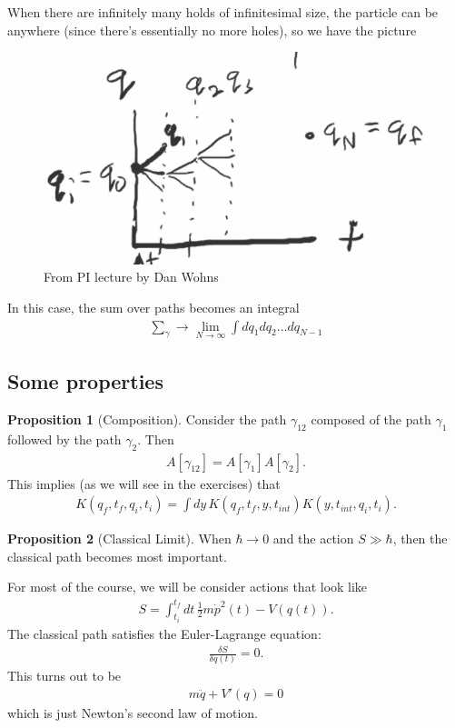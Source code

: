 \documentclass{book}
\theoremstyle{definition}
\newtheorem{prop}{Proposition}[section]
\newcommand{\f}[2]{\frac{#1}{#2}}
\begin{document}
When there are infinitely many holds of infinitesimal size, the particle can be anywhere (since there's essentially no more holes), so we have the picture
\begin{figure}[!htb]
	\centering
	\includegraphics[scale=0.5]{time}
	\caption{From PI lecture by Dan Wohns}
\end{figure}
In this case, the sum over paths becomes an integral
\begin{align}
\sum_\gamma \to \lim_{N\to \infty}\int d q_1dq_2\dots dq_{N-1}
\end{align}


\subsection{Some properties}

\begin{prop}[Composition]
	Consider the path $\gamma_{12}$ composed of the path $\gamma_1$ followed by the path $\gamma_2$. Then
\begin{align}
A[\gamma_{12}] = A[\gamma_1] A[\gamma_2].
\end{align}
This implies (as we will see in the exercises) that
\begin{align}
K(q_f,t_f,q_i,t_i) = \int dy\,K(q_f, t_f,y,t_{int})K(y,t_{int},q_i,t_i).
\end{align}
\end{prop}


\begin{prop}[Classical Limit]
	When $\hbar \to 0$ and the action  $S \gg \hbar$, then the classical path becomes most important. 
\end{prop}


For most of the course, we will be consider actions that look like
\begin{align}
S = \int^{t_f}_{t_i} dt\, \f{1}{2}m\dot{p}^2(t) - V(q(t)).
\end{align}
The classical path satisfies the Euler-Lagrange equation: 
\begin{align}
\f{\delta S}{\delta q(t)} = 0.
\end{align}
This turns out to be 
\begin{align}
m\ddot{q} + V'(q) =0 
\end{align}
which is just Newton's second law of motion. \\
\end{document}
